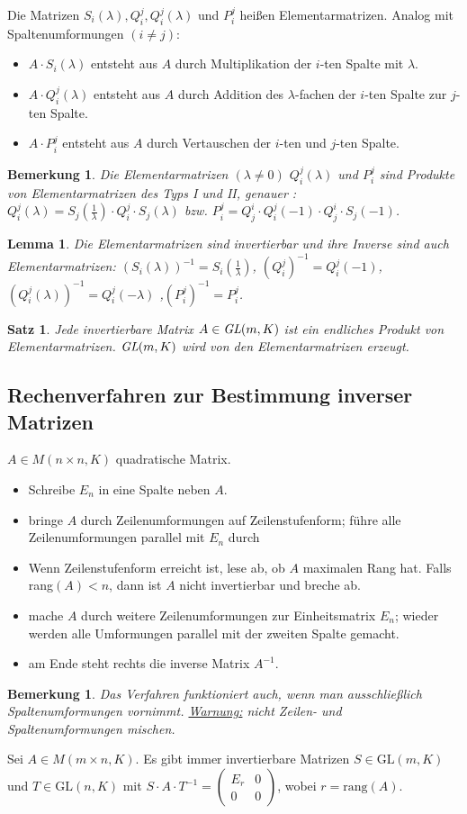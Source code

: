 \documentclass[12pt,a4paper]{article}
\theoremstyle{plain}
\newtheorem{Satz}[Theorem]{Satz}
\newtheorem{Lemma}[Theorem]{Lemma}
\newtheorem{Bemerkung}[Theorem]{Bemerkung}
\numberwithin{equation}{section}
\begin{document}
Die Matrizen $S_i(\lambda), Q^j_i, Q^j_i(\lambda)$ und $P^j_i$ heißen Elementarmatrizen. Analog mit Spaltenumformungen $(i\neq j)$: \begin{itemize}
\item $A\cdot S_i(\lambda)$ entsteht aus $A$ durch Multiplikation der $i$-ten Spalte mit $\lambda$.
\item $A\cdot Q^j_i(\lambda)$ entsteht aus $A$ durch Addition des $\lambda$-fachen der $i$-ten Spalte zur $j$-ten Spalte.
\item $A\cdot P^j_i$ entsteht aus $A$ durch Vertauschen der $i$-ten und $j$-ten Spalte.
\end{itemize}
\begin{Bemerkung}
Die Elementarmatrizen $(\lambda\neq 0)$ $Q^j_i(\lambda)$ und $P^j_i$ sind Produkte von Elementarmatrizen des Typs I und II, genauer : $Q^j_i(\lambda)=S_j(\frac{1}{\lambda})\cdot Q^j_i\cdot S_j(\lambda)$ bzw. $P^j_i=Q^i_j\cdot Q^j_i(-1)\cdot Q^i_j\cdot S_j(-1)$.
\end{Bemerkung}
\begin{Lemma}
Die Elementarmatrizen sind invertierbar und ihre Inverse sind auch Elementarmatrizen: $(S_i(\lambda))^{-1}=S_i(\frac{1}{\lambda})$, $(Q^j_i)^{-1}=Q^j_i(-1)$, $(Q_i^j(\lambda))^{-1}=Q^j_i(-\lambda)$ ,$(P^j_i)^{-1}=P^j_i$.
\end{Lemma}
\begin{Satz}
Jede invertierbare Matrix $A\in\emph{GL}(m,K)$ ist ein endliches Produkt von Elementarmatrizen. \glqq$\emph{GL}(m,K)$ wird von den Elementarmatrizen erzeugt.\grqq
\end{Satz}
\subsection{Rechenverfahren zur Bestimmung inverser Matrizen}
$A\in M(n\times n,K)$ quadratische Matrix.
\begin{itemize}
\item Schreibe $E_n$ in eine Spalte neben $A$.
\item bringe $A$ durch Zeilenumformungen auf Zeilenstufenform; führe alle Zeilenumformungen parallel mit $E_n$ durch
\item Wenn Zeilenstufenform erreicht ist, lese ab, ob $A$ maximalen Rang hat. Falls rang$(A)<n$, dann ist $A$ nicht invertierbar und breche ab.
\item mache $A$ durch weitere Zeilenumformungen zur Einheitsmatrix $E_n$; wieder werden alle Umformungen parallel mit der zweiten Spalte gemacht.
\item am Ende steht rechts die inverse Matrix $A^{-1}$.
\end{itemize}
\begin{Bemerkung}
Das Verfahren funktioniert auch, wenn man ausschließlich Spaltenumformungen vornimmt. \underline{Warnung:} nicht Zeilen- und Spaltenumformungen mischen.
\end{Bemerkung}
Sei $A\in M(m\times n,K)$. Es gibt immer invertierbare Matrizen $S\in\text{GL}(m,K)$ und $T\in\text{GL}(n,K)$ mit $S\cdot A\cdot T^{-1}=\left(\begin{matrix} E_r & 0 \\ 0 & 0 \end{matrix}\right)$, wobei $r=\text{rang}(A)$.
\end{document}
